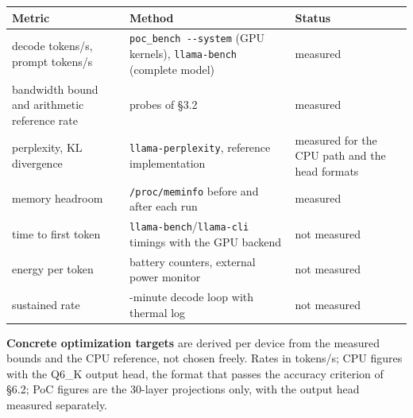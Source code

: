 \documentclass[
  10pt,
]{article}
\newcounter{none} %
\begin{document}
{\def\LTcaptype{none} %
\begin{longtable}[]{@{}
  >{\raggedright\arraybackslash}p{}
  >{\raggedright\arraybackslash}p{}
  >{\raggedright\arraybackslash}p{}@{}}
\toprule\noalign{}
\begin{minipage}[b]{\linewidth}\raggedright%
Metric
\end{minipage} & \begin{minipage}[b]{\linewidth}\raggedright%
Method
\end{minipage} & \begin{minipage}[b]{\linewidth}\raggedright%
Status
\end{minipage} \\
\midrule\noalign{}
\endhead%
\bottomrule\noalign{}
\endlastfoot%
decode tokens/s, prompt tokens/s & \texttt{poc\_bench\ -{}-system} (GPU
kernels), \texttt{llama-bench} (complete model) & measured \\
bandwidth bound and arithmetic reference rate & probes of \S{}3.2 & measured \\
perplexity, KL divergence & \texttt{llama-perplexity}, reference
implementation & measured for the CPU path and the head formats \\
memory headroom & \texttt{/proc/meminfo} before and after each run &
measured \\
time to first token & \texttt{llama-bench}/\texttt{llama-cli} timings
with the GPU backend & not measured \\
energy per token & battery counters, external power monitor & not
measured \\
sustained rate & 30-minute decode loop with thermal log & not
measured \\
\end{longtable}
}

\textbf{Concrete optimization targets} are derived per device from the
measured bounds and the CPU reference, not chosen freely. Rates in
tokens/s; CPU figures with the Q6\_K output head, the format that passes
the accuracy criterion of \S{}6.2; PoC figures are the 30-layer projections
only, with the output head measured separately.
\end{document}
